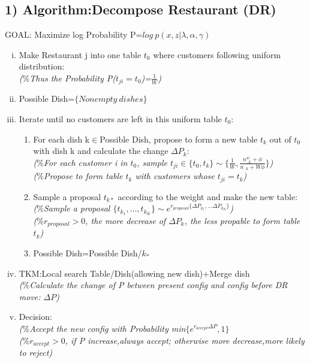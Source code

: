 \documentclass{article}
\begin{document}
\begin{spacing}{1.1}
\section{1) Algorithm:Decompose Restaurant (DR)}
GOAL: Maximize log Probability P=$log \ p(x,z|\lambda,\alpha,\gamma)$ \\
\begin{enumerate}[(i)]
\item Make Restaurant j into one table $t_{0}$ where customers following uniform distribution:\\
\small{\emph{($\%$Thus the Probability P($t_{ji}=t_{0}$)=$\frac{1}{W}$)}}
\item Possible Dish=$\{Nonempty \ dishes\}$
\item Iterate until no customers are left in this uniform table $t_{0}$:
\begin{enumerate}
\item For each dish k$\in$Possible Dish, propose to form a new table $t_{k}$ out of $t_{0}$ with dish k and calculate the change $\Delta P_{k}$:\\
\small{\emph{($\%$For each customer i in $t_{0}$, sample $t_{ji}\in\{t_{0},t_{k}\}\sim\{\frac{1}{W},\frac{n_{..k}^{w}+\phi}{n_{..k}+W\phi}\}$)}}\\
\small{\emph{($\%$Propose to form table $t_{k}$ with customers whose $t_{ji}=t_{k}$)}}
\item Sample a proposal $t_{k*}$ according to the weight and make the new table:\\
\small{\emph{($\%$Sample a proposal $\{t_{k_{1}},...,t_{k_{K}}\}\sim e^{r_{proposal}\{\Delta P_{k_{1}},...\Delta P_{k_{K}}\}}$)}}\\
\small{\emph{($\%r_{proposal}>0$, the more decrease of $\Delta P_{k}$, the less propable to form table $t_{k}$)}}
\item Possible Dish=Possible Dish/$k_{*}$
\end{enumerate}
\item TKM:Local search Table/Dish(allowing new dish)+Merge dish\\
\small{\emph{($\%$Calculate the change of P between present config and config before DR move: $\Delta P$)}}
\item Decision:\\
\small{\emph{($\%$Accept the new config with Probability min$\{e^{r_{accept}\Delta P},1\}$}}\\
\small{\emph{($\%r_{accept}>0$, if P increase,always accept; otherwise more decrease,more likely to reject)}}
\end{enumerate}



\end{spacing}
\end{document}
